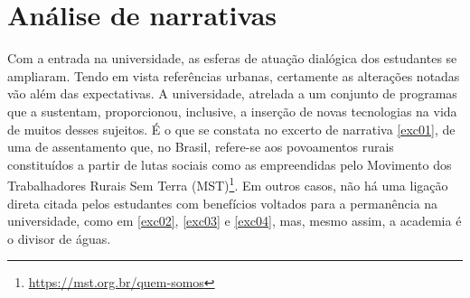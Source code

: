 \documentclass{textolivre}
\begin{document}
\section{Análise de narrativas}\label{sec-analise}
Com a entrada na universidade, as esferas de atuação dialógica dos estudantes se ampliaram. Tendo em vista referências urbanas, certamente as alterações notadas vão além das expectativas. A universidade, atrelada a um conjunto de programas que a sustentam, proporcionou, inclusive, a inserção de novas tecnologias na vida de muitos desses sujeitos. É o que se constata no excerto de narrativa \ref{exc01}, de uma  de assentamento que, no Brasil, refere-se aos povoamentos rurais constituídos a partir de lutas sociais como as empreendidas pelo Movimento dos Trabalhadores Rurais Sem Terra (MST)\footnote{\url{https://mst.org.br/quem-somos}}. Em outros casos, não há uma ligação direta citada pelos estudantes com benefícios voltados para a permanência na universidade, como em \ref{exc02}, \ref{exc03} e \ref{exc04}, mas, mesmo assim, a academia é o divisor de águas.

\end{document}
